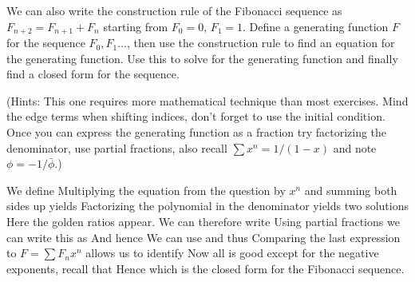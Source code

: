 We can also write the construction rule of the Fibonacci sequence as $F_{n+2} = F_{n+1} + F_{n}$ starting from $F_0=0,\,F_1=1$. 
Define a generating function $F$ for the sequence $F_0,F_1\ldots$, then use the construction rule to find an equation for the generating function. Use this to solve for the generating function and finally find a closed form for the sequence.

(Hints: This one requires more mathematical technique than most exercises. Mind the edge terms when shifting indices, don't forget to use the initial condition. Once you can express the generating function as a fraction try factorizing the denominator, use partial fractions, also recall $\sum x^n = 1/(1-x)$ and note $\phi=-1/\bar{\phi}$.)

\solution
We define 
Multiplying the equation from the question by $x^n$ and summing both sides up yields
Factorizing the polynomial in the denominator yields two solutions 
Here the golden ratios appear. We can therefore write 
Using partial fractions we can write this as 
And hence
We can use 
and thus
Comparing the last expression to $F=\sum F_n x^n$ allows us to identify
Now all is good except for the negative exponents, recall that 
Hence 
which is the closed form for the Fibonacci sequence.


